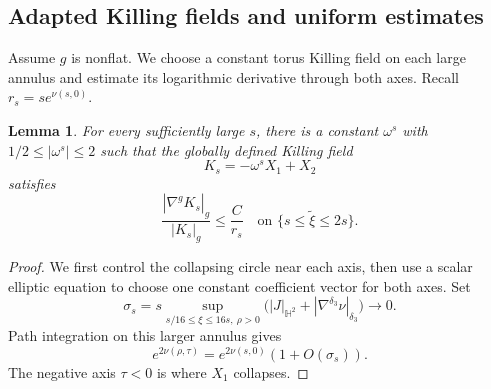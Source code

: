 \documentclass[letterpaper]{amsart}
\newtheorem{lem}[thm]{Lemma}
\theoremstyle{definition}
\theoremstyle{remark}
\begin{document}
\subsection{Adapted Killing fields and uniform estimates}
Assume $g$ is nonflat. We choose a constant torus Killing field on each
large annulus and estimate its logarithmic derivative through both axes. Recall $r_s = s e ^{\nu (s,0)}$.
\begin{lem}\label{notes-killing}
For every sufficiently large $s$, there is a constant $\omega^s$ with
$1/2\le|\omega^s|\le2$ such that the globally defined Killing field
$$
 K_s=-\omega^sX_1+X_2
$$
satisfies
$$
	\frac{|\nabla^gK_s|_g}{|K_s|_g}\le\frac{C}{r_s}
	\quad\text{on }\{s\le \tilde{\xi}\le2s\}.
$$
\end{lem}
\begin{proof}
We first control the collapsing circle near each axis, then use a scalar
elliptic equation to choose one constant coefficient vector for both axes.
Set
\[
 \sigma_s=s\sup_{s/16\le\xi\le16s,\ \rho>0}
 \bigl(|J|_{\mathbb H^2}+|\nabla^{\delta_3}\nu|_{\delta_3}\bigr)
 \to 0.
\]
Path integration on this larger annulus gives
\begin{equation}\label{notes-annular-conformal}
 e^{2\nu(\rho,\tau)}=e^{2\nu(s,0)}(1+O(\sigma_s)).
\end{equation}
The negative axis $\tau<0$ is where $X_1$ collapses.


\end{proof}
\end{document}
